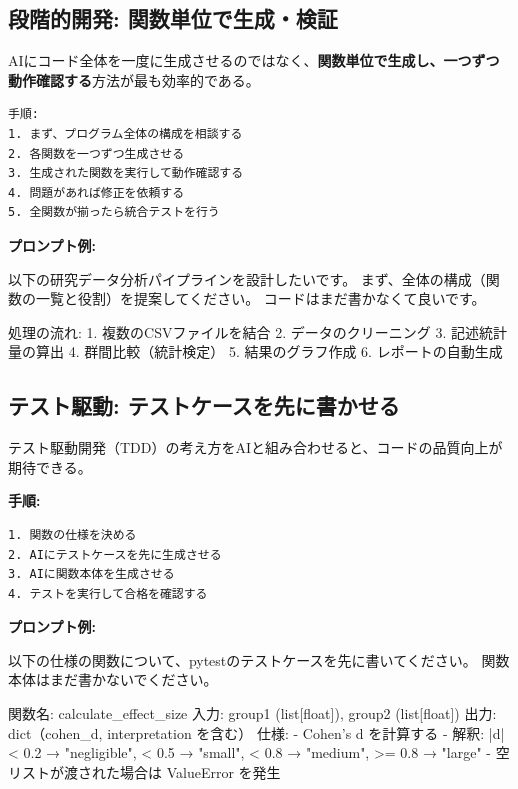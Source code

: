 \subsection{段階的開発: 関数単位で生成・検証}

AIにコード全体を一度に生成させるのではなく、\textbf{関数単位で生成し、一つずつ動作確認する}方法が最も効率的である。

\begin{verbatim}
手順:
1. まず、プログラム全体の構成を相談する
2. 各関数を一つずつ生成させる
3. 生成された関数を実行して動作確認する
4. 問題があれば修正を依頼する
5. 全関数が揃ったら統合テストを行う
\end{verbatim}

\textbf{プロンプト例:}

\begin{promptbox}
以下の研究データ分析パイプラインを設計したいです。
まず、全体の構成（関数の一覧と役割）を提案してください。
コードはまだ書かなくて良いです。

処理の流れ:
1. 複数のCSVファイルを結合
2. データのクリーニング
3. 記述統計量の算出
4. 群間比較（統計検定）
5. 結果のグラフ作成
6. レポートの自動生成
\end{promptbox}

\subsection{テスト駆動: テストケースを先に書かせる}

テスト駆動開発（TDD）の考え方をAIと組み合わせると、コードの品質向上が期待できる。

\textbf{手順:}

\begin{verbatim}
1. 関数の仕様を決める
2. AIにテストケースを先に生成させる
3. AIに関数本体を生成させる
4. テストを実行して合格を確認する
\end{verbatim}

\textbf{プロンプト例:}

\begin{promptbox}
以下の仕様の関数について、pytestのテストケースを先に書いてください。
関数本体はまだ書かないでください。

関数名: calculate\_effect\_size
入力: group1 (list[float]), group2 (list[float])
出力: dict（cohen\_d, interpretation を含む）
仕様:
- Cohen's d を計算する
- 解釈: |d| < 0.2 → "negligible", < 0.5 → "small",
  < 0.8 → "medium", >= 0.8 → "large"
- 空リストが渡された場合は ValueError を発生
\end{promptbox}

